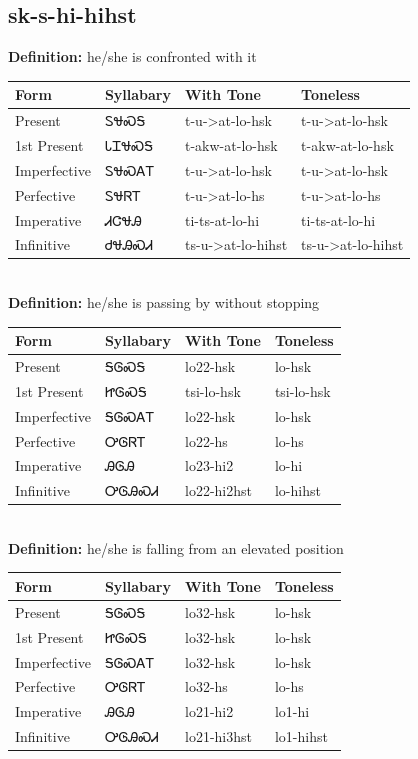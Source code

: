 \documentclass{article}%
\begin{document}
\subsection*{sk-s-hi-hihst}%
\textbf{Definition: }%
he/she is confronted with it%
\\[0.5em]%
\begin{tabular}{|l|l|l|l|}%
\hline%
\textbf{Form}&\textbf{Syllabary}&\textbf{With Tone}&\textbf{Toneless}\\%
\hline%
Present&ᏚᏠᏍᎦ&t{-}u{-}>at{-}lo{-}hsk&t{-}u{-}>at{-}lo{-}hsk\\%
1st Present&ᏓᏆᏠᏍᎦ&t{-}akw{-}at{-}lo{-}hsk&t{-}akw{-}at{-}lo{-}hsk\\%
Imperfective&ᏚᏠᏍᎪᎢ&t{-}u{-}>at{-}lo{-}hsk&t{-}u{-}>at{-}lo{-}hsk\\%
Perfective&ᏚᏠᏒᎢ&t{-}u{-}>at{-}lo{-}hs&t{-}u{-}>at{-}lo{-}hs\\%
Imperative&ᏗᏣᏠᎯ&ti{-}ts{-}at{-}lo{-}hi&ti{-}ts{-}at{-}lo{-}hi\\%
Infinitive&ᏧᏠᎯᏍᏗ&ts{-}u{-}>at{-}lo{-}hihst&ts{-}u{-}>at{-}lo{-}hihst\\%
\hline%
\end{tabular}%
\\[1em]%
\textbf{Definition: }%
he/she is passing by without stopping%
\\[0.5em]%
\begin{tabular}{|l|l|l|l|}%
\hline%
\textbf{Form}&\textbf{Syllabary}&\textbf{With Tone}&\textbf{Toneless}\\%
\hline%
Present&ᎦᎶᏍᎦ&lo22{-}hsk&lo{-}hsk\\%
1st Present&ᏥᎶᏍᎦ&tsi{-}lo{-}hsk&tsi{-}lo{-}hsk\\%
Imperfective&ᎦᎶᏍᎪᎢ&lo22{-}hsk&lo{-}hsk\\%
Perfective&ᎤᎶᏒᎢ&lo22{-}hs&lo{-}hs\\%
Imperative&ᎯᎶᎯ&lo23{-}hi2&lo{-}hi\\%
Infinitive&ᎤᎶᎯᏍᏗ&lo22{-}hi2hst&lo{-}hihst\\%
\hline%
\end{tabular}%
\\[1em]%
\textbf{Definition: }%
he/she is falling from an elevated position%
\\[0.5em]%
\begin{tabular}{|l|l|l|l|}%
\hline%
\textbf{Form}&\textbf{Syllabary}&\textbf{With Tone}&\textbf{Toneless}\\%
\hline%
Present&ᎦᎶᏍᎦ&lo32{-}hsk&lo{-}hsk\\%
1st Present&ᏥᎶᏍᎦ&lo32{-}hsk&lo{-}hsk\\%
Imperfective&ᎦᎶᏍᎪᎢ&lo32{-}hsk&lo{-}hsk\\%
Perfective&ᎤᎶᏒᎢ&lo32{-}hs&lo{-}hs\\%
Imperative&ᎯᎶᎯ&lo21{-}hi2&lo1{-}hi\\%
Infinitive&ᎤᎶᎯᏍᏗ&lo21{-}hi3hst&lo1{-}hihst\\%
\hline%
\end{tabular}%
\\[1em]%
\end{document}
